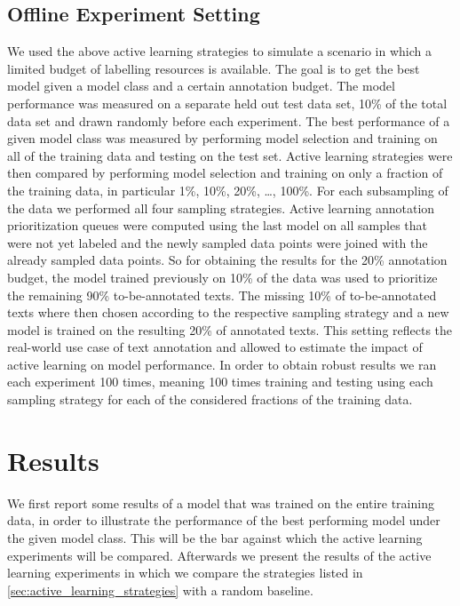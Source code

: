 \documentclass[runningheads,a4paper]{article}
\begin{document}
\subsection{Offline Experiment Setting}
We used the above active learning strategies to simulate a scenario in which a limited budget of labelling resources is available. The goal is to get the best model given a model class and a certain annotation budget. The model performance was measured on a separate held out test data set, 10\% of the total data set and drawn randomly before each experiment. The best performance of a given model class was measured by performing model selection and training on all of the training data and testing on the test set. Active learning strategies were then compared by performing model selection and training on only a fraction of the training data, in particular 1\%, 10\%, 20\%, \dots, 100\%. For each subsampling of the data we performed all four sampling strategies. Active learning annotation prioritization queues were computed using the last model on all samples that were not yet labeled and the newly sampled data points were joined with the already sampled data points. So for obtaining the results for the 20\% annotation budget, the model trained previously on 10\% of the data was used to prioritize the remaining 90\% to-be-annotated texts. The missing 10\% of to-be-annotated texts where then chosen according to the respective sampling strategy and a new model is trained on the resulting 20\% of annotated texts. This setting reflects the real-world use case of text annotation and allowed to estimate the impact of active learning on model performance. In order to obtain robust results we ran each experiment 100 times, meaning 100 times training and testing using each sampling strategy for each of the considered fractions of the training data. 

\section{Results}\label{sec:results}

We first report some results of a model that was trained on the entire training data, in order to illustrate the performance of the best performing model under the given model class. This will be the bar against which the active learning experiments will be compared. Afterwards we present the results of the active learning experiments in which we compare the strategies listed in \autoref{sec:active_learning_strategies} with a random baseline. 
\end{document}
